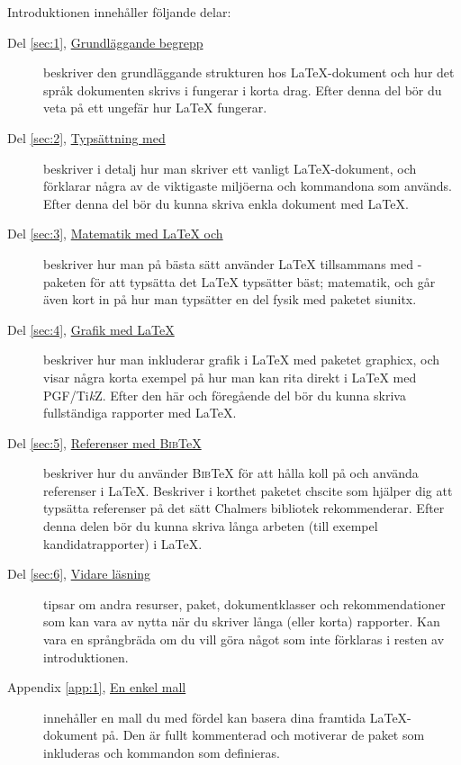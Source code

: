 \documentclass[draft,swe,10pt,nofont]{skrapport}
\makeatletter
\let\@oldLaTeX\LaTeX
\def\LaTeX{\texorpdfstring{\@oldLaTeX}{LaTeX}}
\let\@oldAmS\AmS
\def\AmS{\texorpdfstring{\@oldAmS}{AMS}}
\newcommand\pack[1]{\textsf{#1}}						%
\newcommand\pdfLaTeX{\hologo{pdfLaTeX}}					%
\newcommand\BibTeX{\textsc{Bib}\TeX}					%
\newcommand\PGFTikZ{PGF/Ti\emph{k}Z}					%
\makeatother
\begin{document}
	Introduktionen innehåller följande delar:
	\begin{description}
		\item[{Del \ref{sec:1}, \hyperref[sec:1]{Grundläggande begrepp}}]
		beskriver den grundläggande strukturen hos \LaTeX-dokument och hur det
		språk dokumenten skrivs i fungerar i korta drag. Efter denna del bör
		du veta på ett ungefär hur \LaTeX{} fungerar.
		
		\item[{Del \ref{sec:2}, \hyperref[sec:2]{Typsättning med \pdfLaTeX}}]
		beskriver i detalj hur man skriver ett vanligt
		\LaTeX-dokument, och förklarar några av de viktigaste miljöerna
		och kommandona som används. Efter denna del bör du kunna skriva enkla
		dokument med \LaTeX.
		
		\item[{Del \ref{sec:3}, \hyperref[sec:3]{Matematik med \LaTeX{} och 
		\AmS}}]
		beskriver hur man på bästa sätt använder \LaTeX{} tillsammans med
		\AmS-paketen för att typsätta det \LaTeX{} typsätter bäst; matematik,
		och går även kort in på hur man typsätter en del fysik med paketet
		\pack{siunitx}.
		
		\item[{Del \ref{sec:4}, \hyperref[sec:4]{Grafik med \LaTeX}}]
		beskriver hur man inkluderar grafik i \LaTeX{} med paketet
		\pack{graphicx}, och visar några korta exempel på hur man kan rita
		direkt i \LaTeX{} med \PGFTikZ{}. Efter den här och föregående del bör
		du kunna skriva fullständiga rapporter med \LaTeX.
		
		\item[{Del \ref{sec:5}, \hyperref[sec:5]{Referenser med \BibTeX}}]
		beskriver hur du använder \BibTeX{} för att hålla koll på och använda
		referenser i \LaTeX. Beskriver i korthet paketet \pack{chscite} som
		hjälper dig att typsätta referenser på det sätt Chalmers bibliotek
		rekommenderar. Efter denna delen bör du kunna skriva långa arbeten
		(till exempel kandidatrapporter) i \LaTeX.
		
		\item[{Del \ref{sec:6}, \hyperref[sec:6]{Vidare läsning}}]
		tipsar om andra resurser, paket, dokumentklasser och rekommendationer
		som kan vara av nytta när du skriver långa (eller korta) rapporter.
		Kan vara en språngbräda om du vill göra något som inte förklaras i
		resten av introduktionen.
		
		\item[Appendix \ref{app:1}, {\hyperref[app:1]{En enkel mall}}]
		innehåller en mall du med fördel kan basera dina framtida 
		\LaTeX{}-dokument
		på. Den är fullt kommenterad och motiverar de paket som inkluderas och
		kommandon som definieras.
	\end{description}
	
\end{document}
